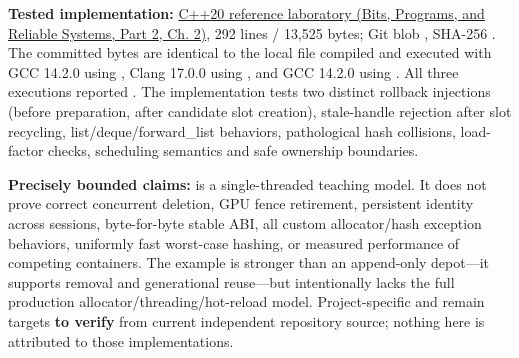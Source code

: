 \textbf{Tested implementation:} \href{../01-Bits-Programs-and-Reliable-Systems-P02/main.pdf\#nameddest=source-file-e829cf731b17419e282775cf}{C++20 reference laboratory (Bits, Programs, and Reliable Systems, Part 2, Ch. 2)}, 292 lines / 13,525 bytes; Git blob , SHA-256 . The committed bytes are identical to the local file compiled and executed with GCC 14.2.0 using , Clang 17.0.0 using , and GCC 14.2.0 using . All three executions reported . The implementation tests two distinct rollback injections (before preparation, after candidate slot creation), stale-handle rejection after slot recycling, list/deque/forward\_list behaviors, pathological hash collisions, load-factor checks, scheduling semantics and safe ownership boundaries.

\textbf{Precisely bounded claims:}  is a single-threaded teaching model. It does not prove correct concurrent deletion, GPU fence retirement, persistent identity across sessions, byte-for-byte stable ABI, all custom allocator/hash exception behaviors, uniformly fast worst-case hashing, or measured performance of competing containers. The example is stronger than an append-only depot---it supports removal and generational reuse---but intentionally lacks the full production allocator/threading/hot-reload model. Project-specific  and  remain targets \textbf{to verify} from current independent repository source; nothing here is attributed to those implementations.

